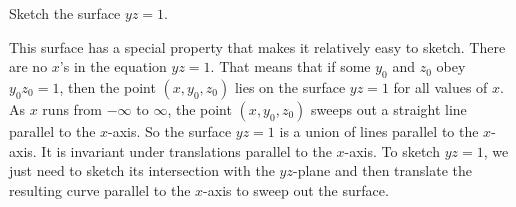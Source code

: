 \bigskip
\begin{eg}[$yz=1$]\label{eg hyperbolic cylinder}
\medskip
Sketch the surface $yz=1$. 

\soln
This surface has a special property that 
makes it relatively easy to sketch. There are no $x$'s in the equation
$yz=1$. That means that if some $y_0$ and $z_0$ obey $y_0z_0=1$,
then the point $(x,y_0,z_0)$ lies on the surface $yz=1$ for all values
of $x$. As $x$ runs from $-\infty$ to $\infty$, the point $(x,y_0,z_0)$
sweeps out a straight line parallel to the $x$-axis. So the surface
$yz=1$ is a union of lines parallel to the $x$-axis. It is invariant under
translations parallel to the $x$-axis. To sketch $yz=1$, we just need
to sketch its intersection with the $yz$-plane and then translate the
resulting curve parallel to the $x$-axis to sweep out the surface.


\end{eg}
